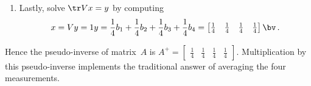 \begin{reduce}
\begin{example}
\begin{enumerate}
\item Lastly, solve \(\tr Vx=y\) by computing 
\begin{equation*}
x=Vy=1y=\h b_1+\h b_2+\h b_3+\h b_4
=\begin{bmatrix} \h&\h&\h&\h \end{bmatrix}\bv\,.
\end{equation*}
\end{enumerate}
\def\h{\frac14}%
Hence the pseudo-inverse of matrix~\(A\) is \(A^+=\begin{bmatrix}  \h&\h&\h&\h\end{bmatrix}\).
Multiplication by this pseudo-inverse implements the traditional answer of averaging the four measurements.
\end{example}
\end{reduce}






